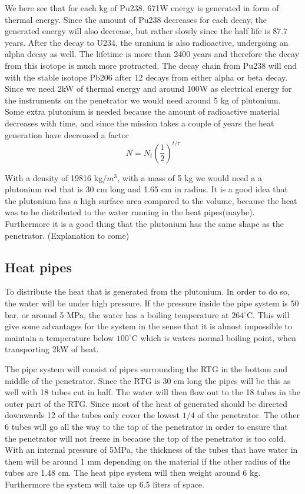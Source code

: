 We here see that for each kg of Pu238, 671W energy is generated in form of thermal energy. Since the amount of Pu238 decreases for each decay, the generated energy will also decrease, but rather slowly since the half life is 87.7 years. 
After the decay to U234, the uranium is also radioactive, undergoing an alpha decay as well. The lifetime is more than 2400 years and therefore the decay from this isotope is much more protracted. The decay chain from Pu238 will end with the stable isotope Pb206 after 12 decays from either alpha or beta decay. \\

Since we need 2kW of thermal energy and around 100W as electrical energy for the instruments on the penetrator we would need around 5 kg of plutonium. Some extra plutonium is needed because the amount of radioactive material decreases with time, and since the mission takes a couple of years the heat generation have decreased a factor 
\begin{equation}
N = N_t \left(\frac{1}{2}\right)^{t/\tau} 
\end{equation}


With a density of 19816 kg$/m^3$, with a mass of 5 kg we would need a a plutonium rod that is 30 cm long and 1.65 cm in radius. It is a good idea that the plutonium has a high surface area compared to the volume, because the heat was to be distributed to the water running in the heat pipes(maybe). Furthermore it is a good thing that the plutonium has the same shape as the penetrator. (Explanation to come) 


\subsection{Heat pipes}
To distribute the heat that is generated from the plutonium. In order to do so, the water will be under high pressure. If the pressure inside the pipe system is 50 bar, or around 5 MPa, the water has a boiling temperature at $264^\circ$C. This will give some advantages for the system in the sense that it is almost impossible to maintain a temperature below $100^\circ$C which is waters normal boiling point, when transporting 2kW of heat. 

The pipe system will consist of pipes surrounding the RTG in the bottom and middle of the penetrator. Since the RTG is 30 cm long the pipes will be this as well with 18 tubes cut in half. The water will then flow out to the 18 tubes in the outer part of the RTG. Since most of the heat of generated should be directed downwards 12 of the tubes only cover the lowest $1/4$ of the penetrator. The other 6 tubes will go all the way to the top of the penetrator in order to ensure that the penetrator will not freeze in because the top of the penetrator is too cold. With an internal pressure of 5MPa, the thickness of the tubes that have water in them will be around 1 mm depending on the material if the other radius of the tubes are 1.48 cm. The heat pipe system will then weight around 6 kg. Furthermore the system will take up 6.5 liters of space. 

